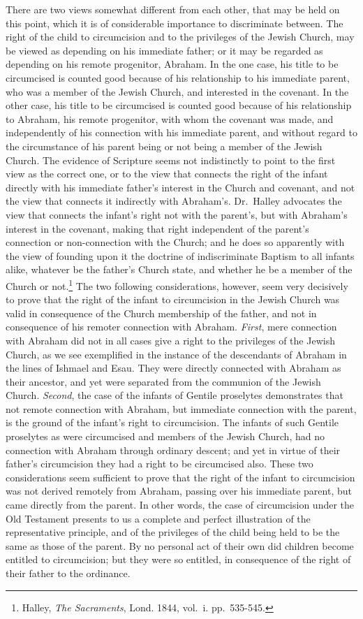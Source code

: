 \documentclass[english,]{book}
\begin{document}
There are two views somewhat different from each other, that may be held on this point, which it is of considerable importance to discriminate between. The right of the child to circumcision and to the privileges of the Jewish Church, may be viewed as depending on his immediate father; or it may be regarded as depending on his remote progenitor, Abraham. In the one case, his title to be circumcised is counted good because of his relationship to his immediate parent, who was a member of the Jewish Church, and interested in the covenant. In the other case, his title to be circumcised is counted good because of his relationship to Abraham, his remote progenitor, with whom the covenant was made, and independently of his connection with his immediate parent, and without regard to the circumstance of his parent being or not being a member of the Jewish Church. The evidence of Scripture seems not indistinctly to point to the first view as the correct one, or to the view that connects the right of the infant directly with his immediate father's interest in the Church and covenant, and not the view that connects it indirectly with Abraham's. Dr.~Halley advocates the view that connects the infant's right not with the parent's, but with Abraham's interest in the covenant, making that right independent of the parent's connection or non-connection with the Church; and he does so apparently with the view of founding upon it the doctrine of indiscriminate Baptism to all infants alike, whatever be the father's Church state, and whether he be a member of the Church or not.\footnote{Halley, \emph{The Sacraments}, Lond. 1844, vol.~i. pp.~535-545.} The two following considerations, however, seem very decisively to prove that the right of the infant to circumcision in the Jewish Church was valid in consequence of the Church membership of the father, and not in consequence of his remoter connection with Abraham. \emph{First}, mere connection with Abraham did not in all cases give a right to the privileges of the Jewish Church, as we see exemplified in the instance of the descendants of Abraham in the lines of Ishmael and Esau. They were directly connected with Abraham as their ancestor, and yet were separated from the communion of the Jewish Church. \emph{Second}, the case of the infants of Gentile proselytes demonstrates that not remote connection with Abraham, but immediate connection with the parent, is the ground of the infant's right to circumcision. The infants of such Gentile proselytes as were circumcised and members of the Jewish Church, had no connection with Abraham through ordinary descent; and yet in virtue of their father's circumcision they had a right to be circumcised also. These two considerations seem sufficient to prove that the right of the infant to circumcision was not derived remotely from Abraham, passing over his immediate parent, but came directly from the parent. In other words, the case of circumcision under the Old Testament presents to us a complete and perfect illustration of the representative principle, and of the privileges of the child being held to be the same as those of the parent. By no personal act of their own did children become entitled to circumcision; but they were so entitled, in consequence of the right of their father to the ordinance.
\end{document}
